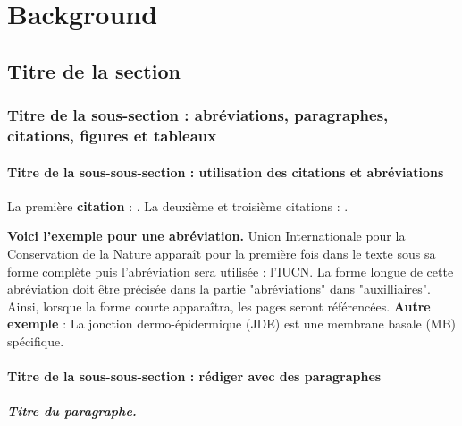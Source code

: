 \chapter{Background} %

\section{Titre de la section}


\subsection{Titre de la sous-section : abréviations, paragraphes, citations, figures et tableaux}
\subsubsection{Titre de la sous-sous-section : utilisation des citations et abréviations}

La première \textbf{citation} : \cite{Ruppell1842}. %
La deuxième et troisième citations : \cite{Faulkes2013,Faulkes2021}.

\textbf{Voici l'exemple pour une abréviation.}
Union Internationale pour la Conservation de la Nature apparaît pour la première fois dans le texte sous sa forme complète puis l'abréviation sera utilisée : l’\acrshort{IUCN}. La forme longue de cette abréviation doit être précisée dans la partie "abréviations" dans "auxilliaires". Ainsi, lorsque la forme courte apparaîtra, les pages seront référencées.
\textbf{Autre exemple }: La jonction dermo-épidermique (\acrshort{JDE}) est une membrane basale (\acrshort{MB}) spécifique.


\subsubsection{Titre de la sous-sous-section : rédiger avec des paragraphes}

\paragraph{Titre du paragraphe.} 

\lipsum[60]

